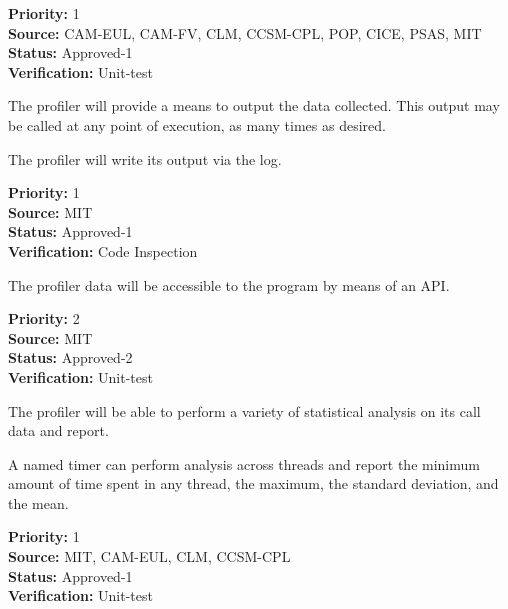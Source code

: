 \begin{reqlist}
{\bf Priority:} 1 \\
{\bf Source:} CAM-EUL, CAM-FV, CLM, CCSM-CPL, POP, CICE, PSAS, MIT \\
{\bf Status:} Approved-1 \\
{\bf Verification:} Unit-test 
\end{reqlist}


The profiler will provide a means to output the data collected.  This
output may be called at any point of execution, as many times as
desired.


The profiler will write its output via the log.  

\begin{reqlist}
{\bf Priority:} 1 \\
{\bf Source:}  MIT \\
{\bf Status:} Approved-1 \\
{\bf Verification:} Code Inspection 
\end{reqlist}


The profiler data will be accessible to the program by means of an API.
\begin{reqlist}
{\bf Priority:} 2 \\
{\bf Source:} MIT  \\
{\bf Status:} Approved-2 \\
{\bf Verification:} Unit-test 
\end{reqlist}


The profiler will be able to perform a variety of statistical analysis
on its call data and report.


A named timer can perform analysis across threads and report the 
minimum amount of time spent in any thread, the maximum, the standard
deviation, and the mean.

\begin{reqlist}
{\bf Priority:} 1 \\
{\bf Source:}  MIT, CAM-EUL, CLM, CCSM-CPL \\
{\bf Status:} Approved-1 \\
{\bf Verification:} Unit-test 
\end{reqlist}


